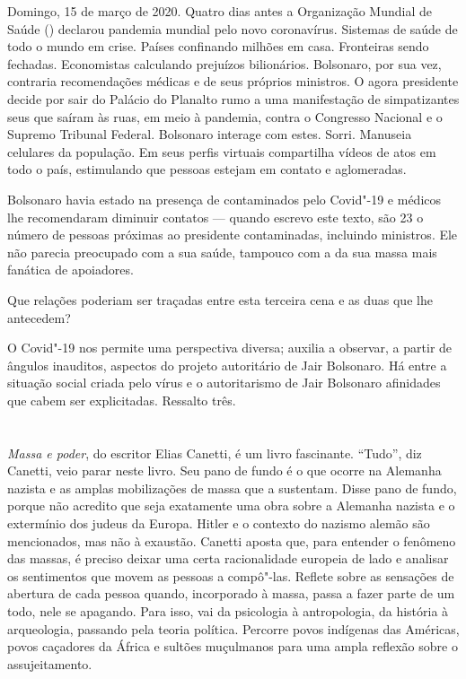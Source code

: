 Domingo, 15 de março de 2020. Quatro dias antes a Organização Mundial de
Saúde () declarou pandemia mundial pelo novo coronavírus. Sistemas de
saúde de todo o mundo em crise. Países confinando milhões em casa.
Fronteiras sendo fechadas. Economistas calculando prejuízos bilionários.
Bolsonaro, por sua vez, contraria recomendações médicas e de seus
próprios ministros. O agora presidente decide por sair do Palácio do
Planalto rumo a uma manifestação de simpatizantes seus que saíram às
ruas, em meio à pandemia, contra o Congresso Nacional e o Supremo
Tribunal Federal. Bolsonaro interage com estes. Sorri. Manuseia
celulares da população. Em seus perfis virtuais compartilha vídeos de
atos em todo o país, estimulando que pessoas estejam em contato e
aglomeradas.

Bolsonaro havia estado na presença de contaminados pelo Covid"-19 e
médicos lhe recomendaram diminuir contatos --- quando escrevo este texto,
são 23 o número de pessoas próximas ao presidente contaminadas,
incluindo ministros. Ele não parecia preocupado com a sua saúde,
tampouco com a da sua massa mais fanática de apoiadores.

\asterisc

Que relações poderiam ser traçadas entre esta terceira cena e as duas
que lhe antecedem?

O Covid"-19 nos permite uma perspectiva diversa; auxilia a observar, a
partir de ângulos inauditos, aspectos do projeto autoritário de Jair
Bolsonaro. Há entre a situação social criada pelo vírus e o
autoritarismo de Jair Bolsonaro afinidades que cabem ser explicitadas.
Ressalto três.

\section*{}

\emph{Massa e poder}, do escritor Elias Canetti, é um livro fascinante.
``Tudo'', diz Canetti, veio parar neste livro. Seu pano de fundo é o que
ocorre na Alemanha nazista e as amplas mobilizações de massa que a
sustentam. Disse pano de fundo, porque não acredito que seja exatamente
uma obra sobre a Alemanha nazista e o extermínio dos judeus da Europa.
Hitler e o contexto do nazismo alemão são mencionados, mas não à
exaustão. Canetti aposta que, para entender o fenômeno das massas, é
preciso deixar uma certa racionalidade europeia de lado e analisar os
sentimentos que movem as pessoas a compô"-las. Reflete sobre as sensações
de abertura de cada pessoa quando, incorporado à massa, passa a fazer
parte de um todo, nele se apagando. Para isso, vai da psicologia à
antropologia, da história à arqueologia, passando pela teoria política.
Percorre povos indígenas das Américas, povos caçadores da África e
sultões muçulmanos para uma ampla reflexão sobre o assujeitamento.

